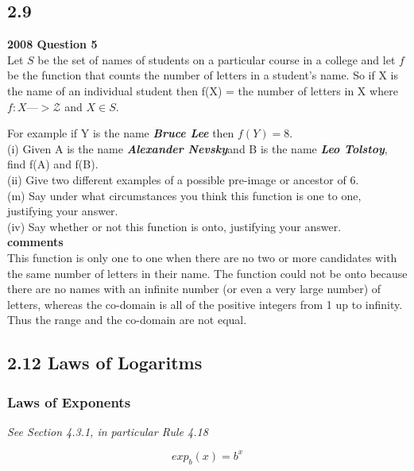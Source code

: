 \documentclass[12 pt]{article}
\begin{document}
\subsection{2.9}
\textbf{2008 Question 5}\\
Let $S$ be the set of names of students on a particular course in a college and
let $f$ be the function that counts the number of letters in a student’s name. So
if X is the name of an individual student then
f(X) = the number of letters in X where $f : X —> \mathcal{Z}$ and $X \in S$.\\
\bigskip

For example if Y is the name \emph{\textbf{Bruce Lee}} then $f(Y) = 8.$\\

(i) Given A is the name \emph{\textbf{Alexander Nevsky}}and B is the name \emph{\textbf{Leo Tolstoy}},
ﬁnd f(A) and f(B).
\\
(ii) Give two different examples of a possible pre-image or ancestor of 6.
\\
(m) Say under what circumstances you think this function is one to one, justifying your answer.
\\
(iv) Say whether or not this function is onto, justifying your answer. \\

\textbf{comments}\\
This function is only one to one when there are no two or more
candidates with the same number of letters in their name. The function
could not be onto because there are no names with an infinite number (or even a very large number) of letters, whereas the co-domain is all of the
positive integers from 1 up to infinity. Thus the range and the co-domain
are not equal.








\subsection*{2.12 Laws of Logaritms}

\subsubsection*{ Laws of Exponents}
\emph{See Section 4.3.1, in particular Rule 4.18}

\[ exp_b(x) = b^x \]
\end{document}
